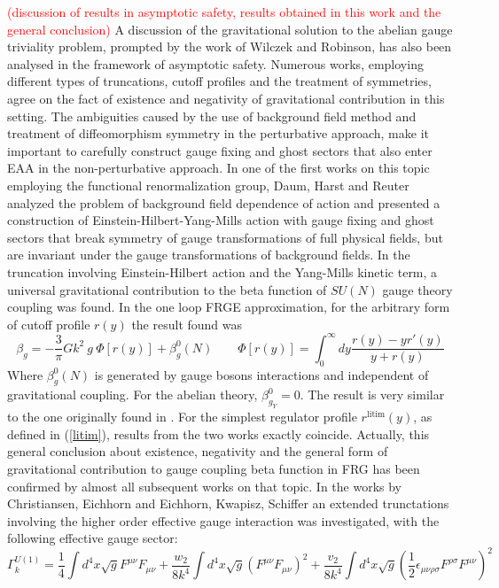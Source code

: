 \documentclass[11pt, a4paper]{article}
\begin{document}
\textcolor{red}{(discussion of results in asymptotic safety, results obtained in this work and the general conclusion)} 
A discussion of the gravitational solution to the abelian gauge triviality problem, prompted by the work of Wilczek and Robinson,
has also been analysed in the framework of asymptotic safety. Numerous works, employing different types of truncations, cutoff
profiles and the treatment of symmetries, agree on the fact of existence and negativity of gravitational contribution in this setting.
The ambiguities caused by the use of background field method and treatment
of diffeomorphism symmetry in the perturbative approach, make it important to carefully construct 
gauge fixing and ghost sectors that also enter EAA in the non-perturbative approach.
In one of the first works on this topic employing the functional renormalization group, Daum, Harst and Reuter \cite{reuter_abelian}
analyzed the problem of background field dependence of action and
presented a construction of Einstein-Hilbert-Yang-Mills action with gauge fixing and ghost sectors that
break symmetry of gauge transformations of full physical fields, but are invariant under the gauge
transformations of background fields. In the truncation involving Einstein-Hilbert action and the Yang-Mills kinetic term,
a universal gravitational contribution to the beta function of $SU(N)$ gauge theory coupling was found.
In the one loop FRGE approximation, for the arbitrary form of cutoff profile $r(y)$ the result found was
\begin{equation}
    \beta_g = - \frac{3}{\pi} Gk^2 \ g \ \Phi[r(y)] + \beta_g^0(N) \qquad \Phi[r(y)] = \int_0^{\infty} dy \frac{r(y) - y r'(y)}{y+r(y)}
\end{equation}
Where $\beta_g^0(N)$ is generated by gauge bosons interactions and independent of gravitational coupling. For the abelian theory, $\beta_{g_{Y}}^0 = 0$. The result is very similar to the one originally found in \cite{wilczek}.
For the simplest regulator profile $r^{\text{litim}}(y)$, as defined in (\ref{litim}), results from the two works exactly coincide.
Actually, this general conclusion about existence, negativity and the general form of gravitational contribution to 
gauge coupling beta function in FRG has been confirmed by almost all subsequent works on that topic.
In the works by Christiansen, Eichhorn \cite{christiansen_eichhorn} and Eichhorn, Kwapisz, Schiffer \cite{kwapisz_eichhorn} an extended trunctations involving the higher order effective
gauge interaction was investigated, with the following effective gauge sector:
\begin{equation}
    \Gamma^{U(1)}_k = \frac{1}{4} \int d^4 x \sqrt{g} F^{\mu\nu} F_{\mu\nu} + \frac{w_2}{8 k^4} \int d^4 x \sqrt{g} \left(F^{\mu\nu} F_{\mu\nu}\right)^2 + \frac{v_2}{8k^4} \int d^4 x \sqrt{g} \left( \frac{1}{2} \epsilon_{\mu\nu\rho\sigma} F^{\rho\sigma} F^{\mu\nu} \right)^2
\end{equation}
\end{document}
